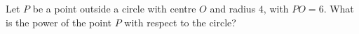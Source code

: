 Let $P$ be a point outside a circle with centre $O$ and radius $4$, with $PO=6$. What is the power of the point $P$ with respect to the circle?
